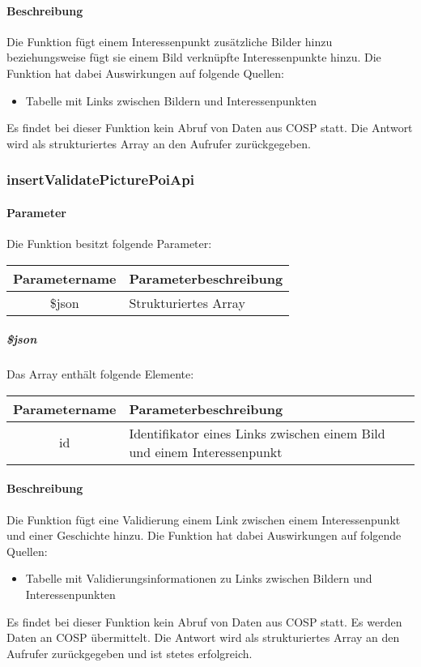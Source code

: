 \paragraph{Beschreibung} Die Funktion fügt einem Interessenpunkt zusätzliche Bilder hinzu beziehungsweise fügt sie einem Bild verknüpfte Interessenpunkte hinzu. Die Funktion hat dabei Auswirkungen auf folgende Quellen:
\begin{itemize}
	\item Tabelle mit Links zwischen Bildern und Interessenpunkten
\end{itemize}
Es findet bei dieser Funktion kein Abruf von Daten aus {\glqq COSP\grqq} statt. Die Antwort wird als strukturiertes Array an den Aufrufer zurückgegeben.
\subsubsection{insertValidatePicturePoiApi}
\paragraph{Parameter} Die Funktion besitzt folgende Parameter:
\begin{table}[H]
	\begin{tabular}{|c|p{11cm}|}
		\hline
		\textbf{Parametername} & \textbf{Parameterbeschreibung} \\ \hline
		\$json & Strukturiertes Array \\ \hline
	\end{tabular}
\end{table}
\subparagraph{\$json}Das Array enthält folgende Elemente:
\begin{table}[H]
	\begin{tabular}{|c|p{11cm}|}
		\hline
		\textbf{Parametername} & \textbf{Parameterbeschreibung} \\ \hline
		id   & Identifikator eines Links zwischen einem Bild und einem Interessenpunkt \\ \hline
	\end{tabular}
\end{table}
\paragraph{Beschreibung} Die Funktion fügt eine Validierung einem Link zwischen einem Interessenpunkt und einer Geschichte hinzu. Die Funktion hat dabei Auswirkungen auf folgende Quellen:
\begin{itemize}
	\item Tabelle mit Validierungsinformationen zu Links zwischen Bildern und Interessenpunkten
\end{itemize}
Es findet bei dieser Funktion kein Abruf von Daten aus {\glqq COSP\grqq} statt. Es werden Daten an {\glqq COSP\grqq} übermittelt. Die Antwort wird als strukturiertes Array an den Aufrufer zurückgegeben und ist stetes erfolgreich.
